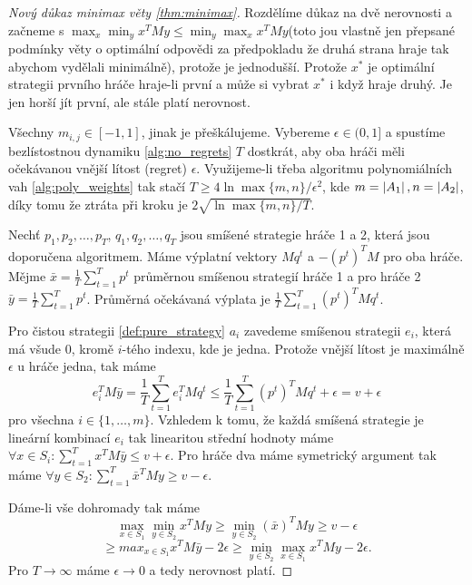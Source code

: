 \begin{proof}[Nový důkaz minimax věty \ref{thm:minimax}]
    Rozdělíme důkaz na dvě nerovnosti a začneme s $\max_x \min_y x^T My \leq \min_y \max_x x^T M y$(toto jou vlastně jen přepsané podmínky věty o optimální odpovědi za předpokladu že druhá strana hraje tak abychom vydělali minimálně), protože je jednodušší. 
    Protože $x^*$ je optimální strategii prvního hráče hraje-li první a může si vybrat $x^*$ i když hraje druhý. 
    Je jen horší jít první, ale stále platí nerovnost. 

    Všechny $m_{i,j} \in [-1,1]$, jinak je přeškálujeme. 
    Vybereme $\epsilon \in (0,1]$ a spustíme bezlístostnou dynamiku \ref{alg:no_regrets} $T$ dostkrát, aby oba hráči měli očekávanou vnější lítost (regret) $\epsilon$. 
    Využijeme-li třeba algoritmu polynomiálních vah \ref{alg:poly_weights} tak stačí $T \geq 4\ln \max\{m,n\}/\epsilon^2$, kde $m = \left|A_1\right|, n = \left|A_2\right|$, díky tomu že ztráta při kroku je $2\sqrt{\ln \max\{m,n\}/T}$. 
    
    Nechť $p_1,p_2,\dots,p_T$, $q_1,q_2,\dots,q_T$ jsou smíšené strategie hráče 1 a 2, která jsou doporučena algoritmem. 
    Máme výplatní vektory $Mq^t$ a $-(p^t)^T M$ pro oba hráče. 
    Mějme $\bar{x} = \frac{1}{T} \sum^T_{t=1} p^t$ průměrnou smíšenou strategií hráče 1 a pro hráče 2 $\bar{y} = \frac{1}{T} \sum_{t=1}^T p^t$. 
    Průměrná očekávaná výplata je $\frac{1}{T} \sum_{t=1}^T (p^t)^T M q^t$. 

    Pro čistou strategii \ref{def:pure_strategy} $a_i$ zavedeme smíšenou strategii $e_i$, která má všude $0$, kromě $i$-tého indexu, kde je jedna. 
    Protože vnější lítost je maximálně $\epsilon$ u hráče jedna, tak máme 
    \[
        e_i^T M \bar{y} = \frac{1}{T} \sum^T_{t=1} e_i^T M q^t \leq \frac{1}{T} \sum_{t=1}^T (p^t)^T M q^t + \epsilon = v +\epsilon 
    \]
    pro všechna $i\in \{1,\dots,m\}$. 
    Vzhledem k tomu, že každá smíšená strategie je lineární kombinací $e_i$ tak linearitou střední hodnoty máme $\forall x \in S_i: \sum_{t=1}^T x^T M \bar{y} \leq v+\epsilon$. 
    Pro hráče dva máme symetrický argument tak máme $\forall y \in S_2: \sum_{t=1}^T \bar{x}^T M y \geq v-\epsilon$. 

    Dáme-li vše dohromady tak máme 
    \[
        \max_{x\in S_1} \min_{y\in S_2} x^T M y \geq \min_{y\in S_2} (\bar{x})^T M y \geq v-\epsilon 
    \]
    \[
        \geq max_{x\in S_1} x^T M \bar{y} -2\epsilon \geq  \min_{y\in S_2} \max_{x\in S_1} x^T M y -2\epsilon.
    \]
    Pro $T\rightarrow \infty$ máme $\epsilon \rightarrow 0$ a tedy nerovnost platí. 
\end{proof}

